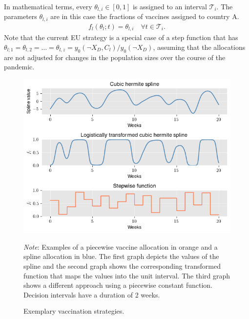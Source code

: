In mathematical terms, every $\theta_{l,i} \in [0,1]$ is assigned to an interval $\mathcal{T}_i$. The parameters $\theta_{l,i}$ are in this case the fractions of vaccines assigned to country A.
\begin{align}
f_l(\theta_l; t) = \theta_{l,i} \quad \forall t \in \mathcal{T}_i.
\end{align}
Note that the current EU strategy is a special case of a step function that has $\theta_{l;1}= \theta_{l,2} = \hdots = \theta_{l,z}=y_0(\neg X_D, C_l)/y_0(\neg X_D)$, assuming that the allocations are not adjusted for changes in the population sizes over the course of the pandemic.
\begin{figure}[h!]
\centering
\includegraphics[scale=0.8]{images/example_methods.png}\\
\begin{flushleft}
\scriptsize{\textit{Note}: Examples of a piecewise vaccine allocation in orange and a spline allocation in blue. The first graph depicts the values of the spline and the second graph shows the corresponding transformed function that maps the values into the unit interval. The third graph shows a different approach using a piecewise constant function. Decision intervals have a duration of 2 weeks.}
\end{flushleft}
\caption{Exemplary vaccination strategies.}
\label{fig:examples}
\end{figure}

